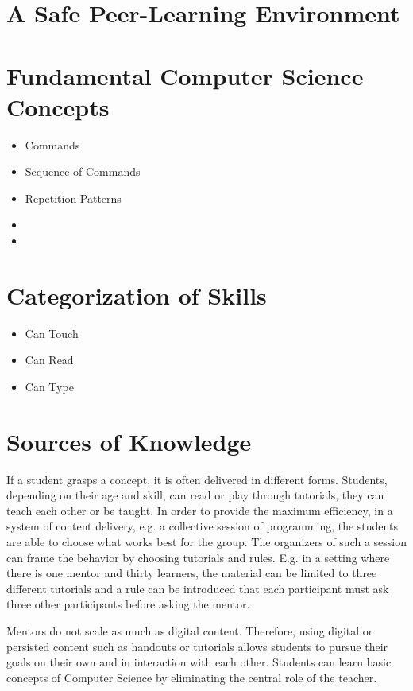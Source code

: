 \section{A Safe Peer-Learning Environment}

\section{Fundamental Computer Science Concepts}

\begin{itemize}
  \item Commands
  \item Sequence of Commands
  \item Repetition Patterns
  \item 
  \item 
\end{itemize}

\section{Categorization of Skills}

\begin{itemize}
  \item Can Touch
  \item Can Read
  \item Can Type
\end{itemize}


\section{Sources of Knowledge}
If a student grasps a concept, it is often delivered in different forms.
Students, depending on their age and skill, can read or play through tutorials, they can teach each other or be taught. 
In order to provide the maximum efficiency, in a system of content delivery, e.g. a collective session of programming, the students are able to choose what works best for the group.
The organizers of such a session can frame the behavior by choosing tutorials and rules.
E.g. in a setting where there is one mentor and thirty learners, the material can be limited to three different tutorials and a rule can be introduced that each participant must ask three other participants before asking the mentor.

Mentors do not scale as much as digital content.
Therefore, using digital or persisted content such as handouts or tutorials allows students to pursue their goals on their own and in interaction with each other. Students can learn basic concepts of Computer Science by eliminating the central role of the  teacher.

